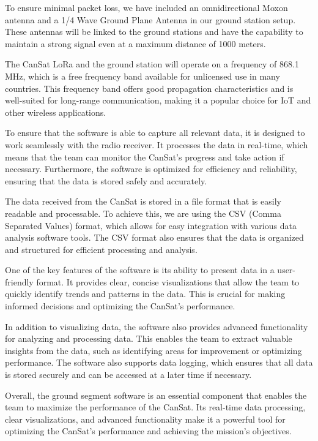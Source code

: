 \documentclass[11pt]{article}
\begin{document}
To ensure minimal packet loss, we have included an omnidirectional Moxon antenna and a 1/4 Wave Ground Plane Antenna in our ground station setup. These antennas will be linked to the ground stations and have the capability to maintain a strong signal even at a maximum distance of 1000 meters.

The CanSat LoRa and the ground station will operate on a frequency of 868.1 MHz, which is a free frequency band available for unlicensed use in many countries. This frequency band offers good propagation characteristics and is well-suited for long-range communication, making it a popular choice for IoT and other wireless applications.

To ensure that the software is able to capture all relevant data, it is designed to work seamlessly with the radio receiver. It processes the data in real-time, which means that the team can monitor the CanSat's progress and take action if necessary. Furthermore, the software is optimized for efficiency and reliability, ensuring that the data is stored safely and accurately.

The data received from the CanSat is stored in a file format that is easily readable and processable. To achieve this, we are using the CSV (Comma Separated Values) format, which allows for easy integration with various data analysis software tools. The CSV format also ensures that the data is organized and structured for efficient processing and analysis.

One of the key features of the software is its ability to present data in a user-friendly format. It provides clear, concise visualizations that allow the team to quickly identify trends and patterns in the data. This is crucial for making informed decisions and optimizing the CanSat's performance.

In addition to visualizing data, the software also provides advanced functionality for analyzing and processing data. This enables the team to extract valuable insights from the data, such as identifying areas for improvement or optimizing performance. The software also supports data logging, which ensures that all data is stored securely and can be accessed at a later time if necessary.

Overall, the ground segment software is an essential component that enables the team to maximize the performance of the CanSat. Its real-time data processing, clear visualizations, and advanced functionality make it a powerful tool for optimizing the CanSat's performance and achieving the mission's objectives.
\end{document}
